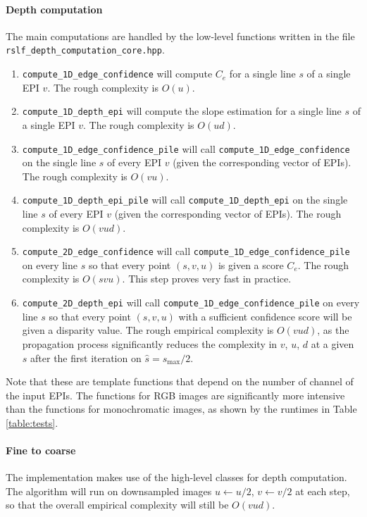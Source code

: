 \documentclass{article}
\newcommand{\grandO}[1]{O\mathopen{}\left(#1\right)}
\theoremstyle{definition}
\begin{document}
\paragraph{Depth computation} The main computations are handled by the low-level functions written in the file \verb#rslf_depth_computation_core.hpp#.
\begin{enumerate}
 \item \verb#compute_1D_edge_confidence# will compute $C_e$ for a single line $s$ of a single EPI $v$. The rough complexity is $\grandO{u}$.
 \item \verb#compute_1D_depth_epi# will compute the slope estimation for a single line $s$ of a single EPI $v$. The rough complexity is $\grandO{ud}$.
 \item \verb#compute_1D_edge_confidence_pile# will call \verb#compute_1D_edge_confidence# on the single line $s$ of every EPI $v$ (given the corresponding vector of EPIs). The rough complexity is $\grandO{vu}$.
 \item \verb#compute_1D_depth_epi_pile# will call \verb#compute_1D_depth_epi# on the single line $s$ of every EPI $v$ (given the corresponding vector of EPIs). The rough complexity is $\grandO{vud}$.
 \item \verb#compute_2D_edge_confidence# will call \verb#compute_1D_edge_confidence_pile# on every line $s$ so that every point $(s, v, u)$ is given a score $C_e$. The rough complexity is $\grandO{svu}$. This step proves very fast in practice.
 \item \verb#compute_2D_depth_epi# will call \verb#compute_1D_edge_confidence_pile# on every line $s$ so that every point $(s, v, u)$ with a sufficient confidence score will be given a disparity value. The rough empirical complexity is $\grandO{vud}$, as the propagation process significantly reduces the complexity in $v$, $u$, $d$ at a given $s$ after the first iteration on $\widehat{s}=s_{\max}/2$.
\end{enumerate}
Note that these are template functions that depend on the number of channel of the input EPIs. The functions for RGB images are significantly more intensive than the functions for monochromatic images, as shown by the runtimes in Table \ref{table:tests}.

\paragraph{Fine to coarse}
The implementation makes use of the high-level classes for depth computation. The algorithm will run on downsampled images $u \leftarrow u/2$, $v \leftarrow v/2$ at each step, so that the overall empirical complexity will still be $\grandO{vud}$.






\end{document}
